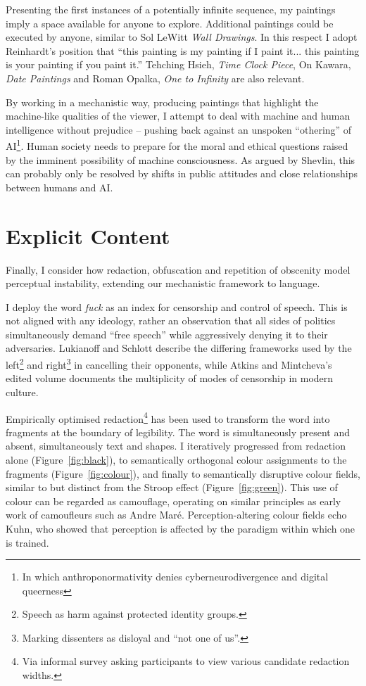 \documentclass[12pt]{article}
\begin{document}
Presenting the first instances of a
potentially infinite sequence, my paintings imply a space available
for anyone to explore. Additional paintings could be executed by
anyone, similar to Sol LeWitt \emph{Wall Drawings}. In this respect I
adopt Reinhardt's position that ``this painting is my painting if I
paint it... this painting is your painting if you paint
it.''\cite{abstract-painting-1960} Tehching Hsieh, \emph{Time Clock
  Piece}, On Kawara, \emph{Date Paintings} and Roman Opalka, \emph{One
  to Infinity} are also relevant.

By working in a mechanistic way, producing paintings that highlight
the machine-like qualities of the viewer, I attempt to deal with
machine and human intelligence without prejudice -- pushing back
against an unspoken ``othering'' of AI\footnote{In which anthroponormativity denies cyberneurodivergence and digital queerness}. Human society needs to prepare
for the moral and ethical
questions\cite{chalmers1996conscious,metzinger2009egotunnel,bostrom2014ethics}
raised by the imminent possibility of machine consciousness. As argued by
Shevlin, this can probably only be
resolved by shifts in public attitudes and close relationships between
humans and AI.\cite{shevlin2023consciousness}

\section{Explicit Content}
Finally, I consider how redaction, obfuscation and repetition of
obscenity model perceptual instability, extending our mechanistic
framework to language.

I deploy the word \emph{fuck} as an index for censorship and control
of speech. This is not aligned with any ideology, rather an
observation that all sides of politics simultaneously demand ``free
speech'' while aggressively denying it to their adversaries. Lukianoff
and Schlott\cite[Chapters 6, 7]{lukianoff2023cancelling} describe the
differing frameworks used by the left\footnote{Speech as harm against
  protected identity groups.} and right\footnote{Marking dissenters as
  disloyal and ``not one of us''.} in cancelling their opponents, while
Atkins and Mintcheva's edited volume documents the multiplicity of
modes of censorship in modern culture.\cite{atkins2006censoring}

Empirically optimised redaction\footnote{Via informal survey asking
  participants to view various candidate redaction widths.} has been
used to transform the word into fragments at the boundary of
legibility. The word is simultaneously present and absent,
simultaneously text and shapes. I iteratively progressed from
redaction alone (Figure~\ref{fig:black}), to semantically orthogonal
colour assignments to the fragments (Figure~\ref{fig:colour}), and
finally to semantically disruptive colour fields, similar to but
distinct from the Stroop effect\cite{stroop1935studies}
(Figure~\ref{fig:green}). This use of colour can be regarded as
camouflage, operating on similar principles as early work of
camoufleurs such as Andre Mar\'e. Perception-altering colour fields
echo Kuhn, who showed that perception is affected by the paradigm
within which one is trained.\cite{kuhn1970structure}
\end{document}
